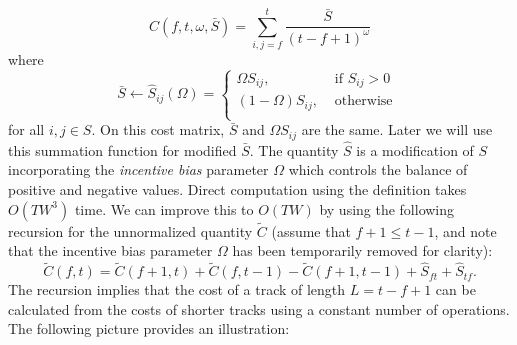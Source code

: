\documentclass[twocolumn]{article}
\begin{document}
	\begin{dmath*}
	C(f,t, \omega, \bar S) =	\sum_{i,j=f}^{t} \frac{ \bar S }{ ( t - f + 1)^\omega }
	\end{dmath*}
where
	\begin{dmath*}
		\bar S \gets \hat S_{ij}(\Omega)=	{ \left\{
			\begin{array}{ll}
				 \Omega {S}_{ij},  & \text{~if~}{S}_{ij} > 0   \\
				 \left( 1-\Omega \right) {S}_{ij}, & \mbox{~otherwise~}\\
			\end{array}
			\right.} 
	\end{dmath*} 
for all $i,j \in {S}$. On this cost matrix, $\bar S$ and $\Omega {S}_{ij}$ are the same. Later we will use this summation function for modified $\bar S$. The quantity $\hat S$ is a modification of $S$ incorporating the \textit{incentive bias} parameter $\Omega$ which controls the balance of
positive and negative values. Direct computation using the definition
takes $O(TW^3)$ time. We can improve this to
$O(TW)$ by using the following recursion for the unnormalized quantity $\tilde C$ (assume that $f+1 \le t-1$, and note that the incentive bias parameter $\Omega$ has been temporarily removed for clarity):
	\begin{dmath*}
		\tilde C(f,t) = \tilde C(f+1,t) + \tilde C(f,t-1) - \tilde C(f+1,t-1) + \hat S_{ft} + \hat S_{tf}.
	\end{dmath*} 
The recursion implies that the cost of a track of length $L=t-f+1$ can
be calculated from the costs of shorter tracks using a constant number
of operations. The following picture provides an
illustration:
	
\end{document}

